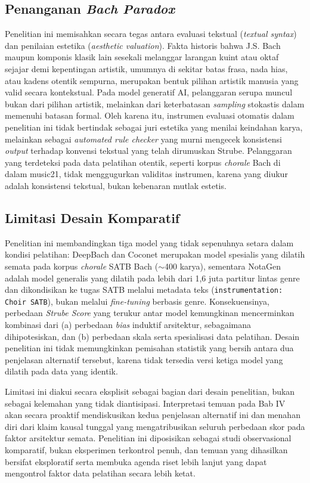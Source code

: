 \subsection{Penanganan \textit{Bach Paradox}}

Penelitian ini memisahkan secara tegas antara evaluasi tekstual (\textit{textual syntax}) dan penilaian estetika (\textit{aesthetic valuation}). Fakta historis bahwa J.S. Bach maupun komponis klasik lain sesekali melanggar larangan kuint atau oktaf sejajar demi kepentingan artistik, umumnya di sekitar batas frasa, nada hias, atau kadens otentik sempurna, merupakan bentuk pilihan artistik manusia yang valid secara kontekstual. Pada model generatif AI, pelanggaran serupa muncul bukan dari pilihan artistik, melainkan dari keterbatasan \textit{sampling} stokastis dalam memenuhi batasan formal. Oleh karena itu, instrumen evaluasi otomatis dalam penelitian ini tidak bertindak sebagai juri estetika yang menilai keindahan karya, melainkan sebagai \textit{automated rule checker} yang murni mengecek konsistensi \textit{output} terhadap konvensi tekstual yang telah dirumuskan Strube. Pelanggaran yang terdeteksi pada data pelatihan otentik, seperti korpus \textit{chorale} Bach di dalam music21, tidak menggugurkan validitas instrumen, karena yang diukur adalah konsistensi tekstual, bukan kebenaran mutlak estetis.

\subsection{Limitasi Desain Komparatif}

Penelitian ini membandingkan tiga model yang tidak sepenuhnya setara dalam kondisi pelatihan: DeepBach dan Coconet merupakan model spesialis yang dilatih semata pada korpus \textit{chorale} SATB Bach ($\sim$400 karya), sementara NotaGen adalah model generalis yang dilatih pada lebih dari 1,6 juta partitur lintas genre dan dikondisikan ke tugas SATB melalui metadata teks (\texttt{instrumentation: Choir SATB}), bukan melalui \textit{fine-tuning} berbasis genre. Konsekuensinya, perbedaan \textit{Strube Score} yang terukur antar model kemungkinan mencerminkan kombinasi dari (a) perbedaan \textit{bias} induktif arsitektur, sebagaimana dihipotesiskan, dan (b) perbedaan skala serta spesialisasi data pelatihan. Desain penelitian ini tidak memungkinkan pemisahan statistik yang bersih antara dua penjelasan alternatif tersebut, karena tidak tersedia versi ketiga model yang dilatih pada data yang identik.

Limitasi ini diakui secara eksplisit sebagai bagian dari desain penelitian, bukan sebagai kelemahan yang tidak diantisipasi. Interpretasi temuan pada Bab IV akan secara proaktif mendiskusikan kedua penjelasan alternatif ini dan menahan diri dari klaim kausal tunggal yang mengatribusikan seluruh perbedaan skor pada faktor arsitektur semata. Penelitian ini diposisikan sebagai studi observasional komparatif, bukan eksperimen terkontrol penuh, dan temuan yang dihasilkan bersifat eksploratif serta membuka agenda riset lebih lanjut yang dapat mengontrol faktor data pelatihan secara lebih ketat.

